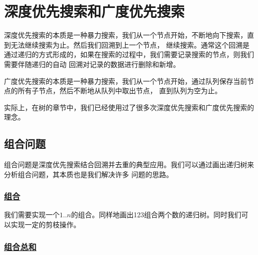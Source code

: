 \documentclass[../../main.tex]{subfiles}
\begin{document}
\setchapterpreamble[u]{\margintoc}

\chapter{深度优先搜索和广度优先搜索}

深度优先搜索的本质是一种暴力搜索，我们从一个节点开始，不断地向下搜索，直到无法继续搜索为止。然后我们回溯到上一个节点，
继续搜索。通常这个回溯是通过递归的方式形成的，如果在搜索的过程中，我们需要记录搜索的节点，则我们需要伴随递归的自动
回溯对记录的数据进行删除和新增。

广度优先搜索的本质是一种暴力搜索，我们从一个节点开始，通过队列保存当前节点的所有子节点，然后不断地从队列中取出节点，
直到队列为空为止。

实际上，在树的章节中，我们已经使用过了很多次深度优先搜索和广度优先搜索的理念。

\section{组合问题}

组合问题是深度优先搜索结合回溯并去重的典型应用。我们可以通过画出递归树来分析组合问题，其本质也是我们解决许多
问题的思路。

\subsection{\href{https://leetcode.cn/problems/combinations/}{组合}}
\label{subsec:combinations}

我们需要实现一个$1..n$的组合。同样地画出123组合两个数的递归树。同时我们可以实现一定的剪枝操作。




\subsection{\href{https://leetcode.cn/problems/combination-sum/}{组合总和}}
\label{subsec:combination-sum}
\end{document}
